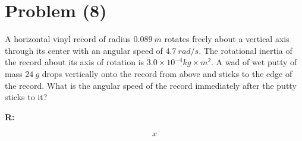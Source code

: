\section{Problem (8)}
	A horizontal vinyl record of radius $0.089 \ m$ rotates freely about a vertical axis through its center with an angular speed of $4.7 \ rad/s$. The rotational inertia of the record about its axis of rotation is $3.0 \times 10^{-4} kg \times m^{2}$. A wad of wet putty of mass $24 \ g$ drops vertically onto the record from above and sticks to the edge of the record. What is the angular speed of the record immediately after the putty sticks to it?

	\textbf{R:}

	\begin{align}
		x
	\end{align}
